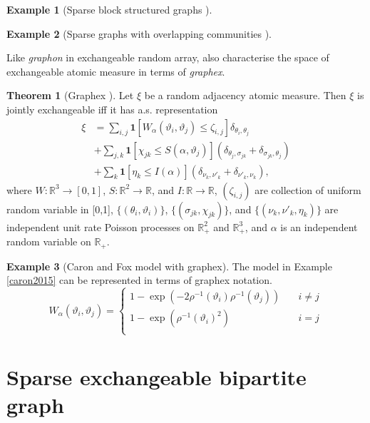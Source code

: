 \documentclass{article}
\theoremstyle{definition}
\newtheorem{example}{Example}[definition]
\newtheorem{theorem}[definition]{Theorem}
\begin{document}
\begin{example}[Sparse block structured graphs \citep{Herlau2015}]
\end{example}

\begin{example}[Sparse graphs with overlapping communities \citep{Todeschini2016}]
\end{example}


Like \textit{graphon} in exchangeable random array, \citep{Veitch2015} also characterise the space of exchangeable atomic measure in terms of \textit{graphex}.

\begin{theorem}[Graphex \citep{Veitch2015}] Let $\xi$ be a random adjacency atomic measure. Then $\xi$ is jointly exchangeable iff it has a.s. representation
\begin{align}
\xi &= \sum_{i,j}\mathbf{1} [W_\alpha(\vartheta_i, \vartheta_j) \leq \zeta_{i,j}]\delta_{\theta_i, \theta_j} \\
&+\sum_{j,k} \mathbf{1} [\chi_{jk} \leq S(\alpha, \vartheta_j)](\delta_{\theta_j,\sigma_{jk}} +  \delta_{\sigma_{jk},\theta_j}) \\
&+\sum_{k} \mathbf{1} [\eta_{k} \leq I(\alpha)](\delta_{\nu_k,\nu'_k} + \delta_{\nu'_k, \nu_k}),
\end{align}
where $W:\mathbb{R}^3 \rightarrow [0,1]$, $S:\mathbb{R}^2 \rightarrow \mathbb{R}$, and $I:\mathbb{R}\rightarrow\mathbb{R}$, $(\zeta_{i,j})$ are collection of uniform random variable in [0,1], $\{(\theta_i, \vartheta_i)\}$, $\{(\sigma_{jk}, \chi_{jk})\}$, and $\{(\nu_k, \nu'_k, \eta_{k})\}$ are independent unit rate Poisson processes on $\mathbb{R}^2_+$ and $\mathbb{R}^3_+$, and $\alpha$ is an independent random variable on $\mathbb{R}_+$.
\end{theorem}

\begin{example}[Caron and Fox model with graphex] The model in Example \ref{caron2015} can be represented in terms of graphex notation.
\[ W_\alpha(\vartheta_i, \vartheta_j) =
	\begin{cases}
	1- \exp(-2\rho^{-1}(\vartheta_i)\rho^{-1}(\vartheta_j)) & \quad i \neq j\\
    1 - \exp( \rho^{-1}(\vartheta_i)^2) & \quad i = j\\
	\end{cases}
\]

\end{example}

\section{Sparse exchangeable bipartite graph}
\end{document}
